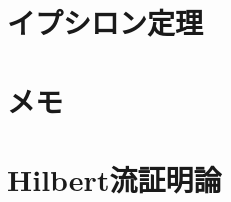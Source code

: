 \documentclass[a4j,10.5pt,oneside,openany]{jsbook}
\theoremstyle{mystyle}
\begin{document}
\chapter{イプシロン定理}
	
	
	

\chapter{メモ}
	
	

\chapter{Hilbert流証明論}
	


\end{document}
